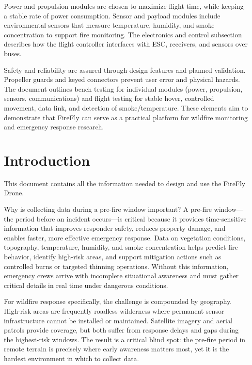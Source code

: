 \documentclass[journal, onecolumn]{IEEEtran}
\begin{document}
Power and propulsion modules are chosen to maximize flight time, while keeping a stable rate of power consumption. Sensor and payload modules include environmental sensors that measure temperature, humidity, and smoke concentration to support fire monitoring. The electronics and control subsection describes how the flight controller interfaces with ESC, receivers, and sensors over buses.

Safety and reliability are assured through design features and planned validation. Propeller guards and keyed connectors prevent user error and physical hazards. The document outlines bench testing for individual modules (power, propulsion, sensors, communications) and flight testing for stable hover, controlled movement, data link, and detection of smoke/temperature. These elements aim to demonstrate that FireFly can serve as a practical platform for wildfire monitoring and emergency response research.

 



\clearpage


\section{Introduction}
This document contains all the information needed to design and use the FireFly Drone.

\vspace{1em}

Why is collecting data during a pre-fire window important? A pre-fire window---the period before an incident occurs---is critical because it provides time-sensitive information that improves responder safety, reduces property damage, and enables faster, more effective emergency response. Data on vegetation conditions, topography, temperature, humidity, and smoke concentration helps predict fire behavior, identify high-risk areas, and support mitigation actions such as controlled burns or targeted thinning operations. Without this information, emergency crews arrive with incomplete situational awareness and must gather critical details in real time under dangerous conditions.

\vspace{1em}

For wildfire response specifically, the challenge is compounded by geography. High-risk areas are frequently roadless wilderness where permanent sensor infrastructure cannot be installed or maintained. Satellite imagery and aerial patrols provide coverage, but both suffer from response delays and gaps during the highest-risk windows. The result is a critical blind spot: the pre-fire period in remote terrain is precisely where early awareness matters most, yet it is the hardest environment in which to collect data.
\end{document}
